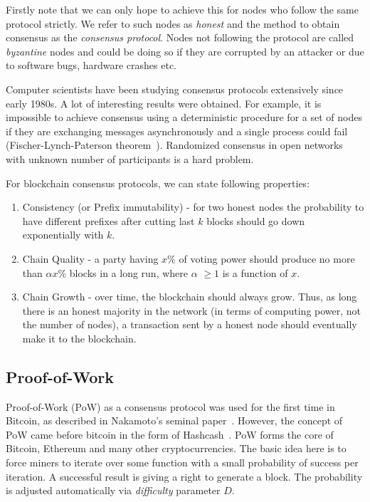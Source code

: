 \documentclass[]{report}   %
\begin{document}
Firstly note that we can only hope to achieve this for nodes who follow the same protocol strictly. We refer to such nodes as \textit{honest} and the method to obtain consensus as the \textit{consensus protocol}. Nodes not following the protocol are called \textit{byzantine} nodes and could be doing so if they are corrupted by an attacker or due to software bugs, hardware crashes etc. 


Computer scientists have been studying consensus protocols extensively since early 1980s. A lot of interesting results were obtained. For example, it is impossible to achieve consensus using a deterministic procedure for a set of nodes if they are exchanging messages asynchronously and a single process could fail (Fischer-Lynch-Paterson theorem~\cite{fischer1985impossibility}). 
Randomized consensus in open networks with unknown number of participants is a hard problem. %


For blockchain consensus protocols, we can state following properties:

\begin{enumerate}
\item{Consistency (or Prefix immutability)} - for two honest nodes the probability to have different prefixes after cutting last \(k\) blocks should go down exponentially with \(k\).
\item{Chain Quality} - a party having \(x\%\) of voting power should produce no more than \(\alpha x \%\) blocks in a long run, where \(\alpha\) $\geq 1$ is a function of \(x\).
\item{Chain Growth} - over time, the blockchain should always grow. Thus, as long there is an honest majority in the network (in terms of computing power, not the number of nodes), a transaction sent by a honest node should eventually make it to the blockchain.
\end{enumerate}


\subsection{Proof-of-Work}

Proof-of-Work (PoW) as a consensus protocol was used for the first time in Bitcoin, as described in Nakamoto's seminal paper~\cite{Nakamoto2008}.
However, the concept of PoW came before bitcoin in the form of Hashcash~\cite{back2002hashcash}.
PoW forms the core of Bitcoin, Ethereum and many other cryptocurrencies. The basic idea here is to force miners to iterate over some function with a small probability of success per iteration. A successful result is giving a right to generate a block. The probability is adjusted automatically via \textit{difficulty} parameter \(D\). 
\end{document}
